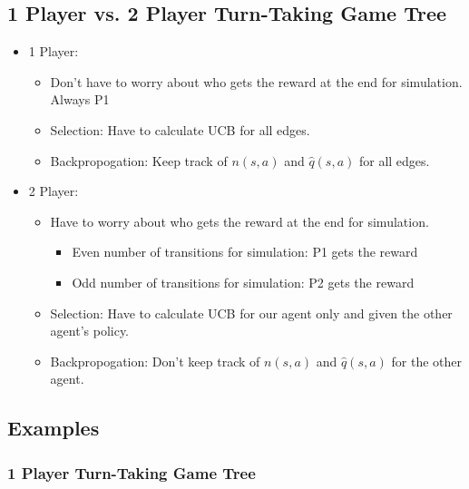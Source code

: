 \subsection{1 Player vs. 2 Player Turn-Taking Game Tree}
\begin{notes}
    \begin{itemize}
        \item 1 Player: 
        \begin{itemize}
            \item Don't have to worry about who gets the reward at the end for simulation. Always P1
            \item Selection: Have to calculate UCB for all edges. 
            \item Backpropogation: Keep track of $n(s,a)$ and $\hat{q}(s,a)$ for all edges. 
        \end{itemize}
        \item 2 Player: 
        \begin{itemize}
            \item Have to worry about who gets the reward at the end for simulation. 
            \begin{itemize}
                \item Even number of transitions for simulation: P1 gets the reward
                \item Odd number of transitions for simulation: P2 gets the reward
            \end{itemize}
            \item Selection: Have to calculate UCB for our agent only and given the other agent's policy. 
            \item Backpropogation: Don't keep track of $n(s,a)$ and $\hat{q}(s,a)$ for the other agent. 
        \end{itemize}
    \end{itemize}
\end{notes}
\newpage

\subsection{Examples}
\subsubsection{1 Player Turn-Taking Game Tree}
\newpage



